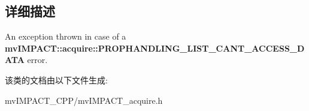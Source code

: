 \subsection{详细描述}
An exception thrown in case of a {\bfseries mv\+I\+M\+P\+A\+C\+T\+::acquire\+::\+P\+R\+O\+P\+H\+A\+N\+D\+L\+I\+N\+G\+\_\+\+L\+I\+S\+T\+\_\+\+C\+A\+N\+T\+\_\+\+A\+C\+C\+E\+S\+S\+\_\+\+D\+A\+T\+A} error. 

该类的文档由以下文件生成\+:\begin{DoxyCompactItemize}
\item 
mv\+I\+M\+P\+A\+C\+T\+\_\+\+C\+P\+P/mv\+I\+M\+P\+A\+C\+T\+\_\+acquire.\+h\end{DoxyCompactItemize}
